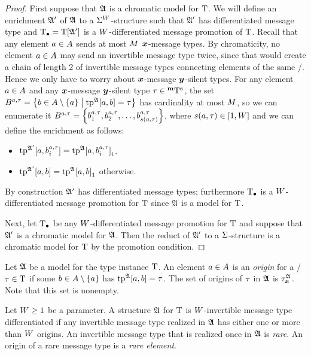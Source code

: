 \begin{proof}
First suppose that $\mathfrak{A}$ is a chromatic model for $\mathrm{T}$.
We will define an enrichment $\mathfrak{A'}$ of $\mathfrak{A}$ to a ${\mathrm{\Sigma}}^{W}$-structure
such that $\mathfrak{A'}$ has differentiated message type and $\mathrm{T}_{\bullet} = \mathrm{T}[\mathfrak{A'}]$ is a
$W$-differentiated message promotion of $\mathrm{T}$.
Recall that any element $a\in A$ sends at most $M$ $\bm{x}$-message types.
By chromaticity, no element $a\in A$ may send an invertible message type
twice, since that would create a chain of length $2$ of invertible message types
connecting elements of the same \onetype/.
Hence we only have to worry about $\bm{x}$-message $\bm{y}$-silent types.
For any element $a\in A$ and any $\bm{x}$-message $\bm{y}$-silent type
$\tau\in{{}^{\bm{\mathrm{m}}}{\mathrm{T}}^{\bm{\mathrm{s}}}}$, the set
$B^{a,\tau} = \left\{b\in A\setminus\left\{a\right\}\mathrel{}\middle|\mathrel{}\operatorname{tp}^{\mathfrak{A}}[a,b]=\tau\right\}$ has
cardinality at most $M$, so we can enumerate it $B^{a,\tau} =
\left\{b^{a,\tau}_1,b^{a,\tau}_2,\dots,b^{a,\tau}_{s(a,\tau)}\right\}$,
where $s(a,\tau)\in[1,W]$ and we can define the enrichment as follows:
\begin{itemize}
  \item $\operatorname{tp}^{\mathfrak{A'}}[a,b^{a,\tau}_i] =
  {\operatorname{tp}^{\mathfrak{A}}[a,b^{a,\tau}_i]}_{i}$.
  \item $\operatorname{tp}^{\mathfrak{A'}}[a,b] = {\operatorname{tp}^{\mathfrak{A}}[a,b]}_{1}$ otherwise.
\end{itemize}
By construction $\mathfrak{A'}$ has differentiated message types; furthermore $\mathrm{T}_{\bullet}$ is
a $W$-differentiated message promotion for $\mathrm{T}$ since $\mathfrak{A}$ is a model for
$\mathrm{T}$.

Next, let $\mathrm{T}_{\bullet}$ be any $W$-differentiated message promotion for $\mathrm{T}$ and
suppose that $\mathfrak{A'}$ is a chromatic model for $\mathfrak{A}$. Then the reduct of
$\mathfrak{A'}$ to a $\mathrm{\Sigma}$-structure is a chromatic model for $\mathrm{T}$ by the promotion
condition.
\end{proof}

\begin{definition}
Let $\mathfrak{A}$ be a model for the type instance $\mathrm{T}$.
An element $a\in A$ is an \emph{origin} for a \twotype/ $\tau\in\mathrm{T}$ if
some $b\in A\setminus\left\{a\right\}$ has $\operatorname{tp}^{\mathfrak{A}}[a,b] = \tau$.
The set of origins of $\tau$ in $\mathfrak{A}$ is ${\tau}_{\bm{x}}^{\mathfrak{A}}$.
Note that this set is nonempty.
\end{definition}
\begin{definition}
Let $W\geq1$ be a parameter.
A structure $\mathfrak{A}$ for $\mathrm{T}$ is $W$-invertible message type differentiated
if any invertible message type realized in $\mathfrak{A}$ has either one or more than
$W$ origins.
An invertible message type that is realized once in $\mathfrak{A}$ is \emph{rare}.
An origin of a rare message type is a \emph{rare element}.
\end{definition}

